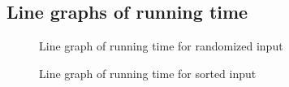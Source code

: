 \documentclass[12pt,a4paper]{article}
\begin{document}
\subsection{Line graphs of running time}
\begin{center}
\begin{figure}[H]
\caption{Line graph of running time for randomized input}
\end{figure}
\end{center}

\begin{center}
\begin{figure}[H]
\caption{Line graph of running time for sorted input}
\end{figure}
\end{center}
\end{document}
